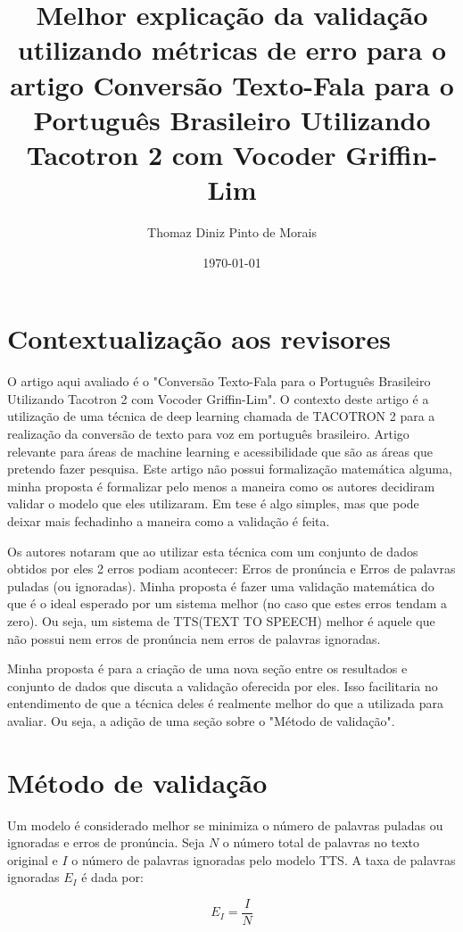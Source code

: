 \documentclass{article}
\title{Melhor explicação da validação utilizando métricas de erro para o artigo Conversão Texto-Fala para o Português Brasileiro
Utilizando Tacotron 2 com Vocoder Griffin-Lim}
\author{Thomaz Diniz Pinto de Morais}
\date{\today}
\begin{document}
\maketitle

\section{Contextualização aos revisores}
O artigo aqui avaliado é o "Conversão Texto-Fala para o Português Brasileiro
Utilizando Tacotron 2 com Vocoder Griffin-Lim". O contexto deste artigo é a utilização de uma técnica de deep learning chamada de TACOTRON 2 para a realização da conversão de texto para voz em português brasileiro. Artigo relevante para áreas de machine learning e acessibilidade que são as áreas que pretendo fazer pesquisa. Este artigo não possui formalização matemática alguma, minha proposta é formalizar pelo menos a maneira como os autores decidiram validar o modelo que eles utilizaram. Em tese é algo simples, mas que pode deixar mais fechadinho a maneira como a validação é feita.

Os autores notaram que ao utilizar esta técnica com um conjunto de dados obtidos por eles 2 erros podiam acontecer: Erros de pronúncia e Erros de palavras puladas (ou ignoradas). Minha proposta é fazer uma validação matemática do que é o ideal esperado por um sistema melhor (no caso que estes erros tendam a zero). Ou seja, um sistema de TTS(TEXT TO SPEECH) melhor é aquele que não possui nem erros de pronúncia nem erros de palavras ignoradas.

Minha proposta é para a criação de uma nova seção entre os resultados e conjunto de dados que discuta a validação oferecida por eles. Isso facilitaria no entendimento de que a técnica deles é realmente melhor do que a utilizada para avaliar. Ou seja, a adição de uma seção sobre o "Método de validação".

\section{Método de validação}
Um modelo é considerado melhor se minimiza o número de palavras puladas ou ignoradas e erros de pronúncia. Seja \( N \) o número total de palavras no texto original e \( I \) o número de palavras ignoradas pelo modelo TTS. A taxa de palavras ignoradas \( E_I \) é dada por:

\begin{equation}
E_I = \frac{I}{N}
\end{equation}
\end{document}
